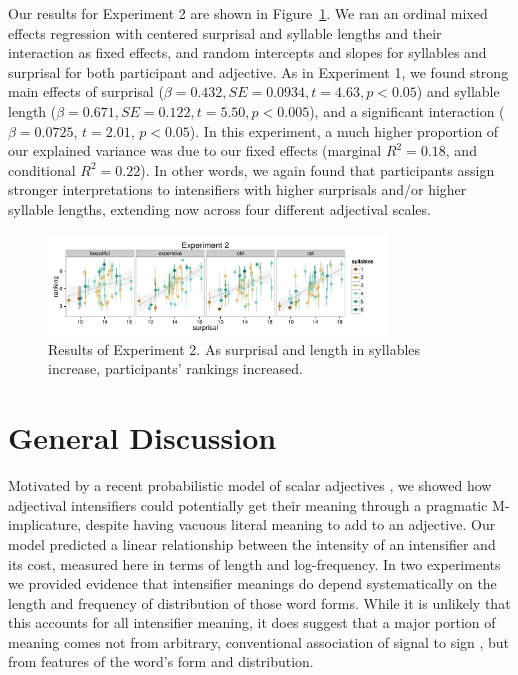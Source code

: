\documentclass[10pt,letterpaper]{article}
\begin{document}
Our results for Experiment 2 are shown in Figure~\ref{exp2-plot}. We ran an ordinal mixed effects
regression with centered surprisal and syllable lengths and their interaction as fixed effects, and random intercepts and slopes for syllables and surprisal for both participant and adjective.
As in Experiment 1, we found strong main effects of surprisal ($\beta=0.432, SE=0.0934, t=4.63, p<0.05$) and syllable length ($\beta=0.671, SE=0.122, t=5.50, p<0.005$), and a significant interaction ($\beta=0.0725$, $t=2.01$, $p<0.05$). In this experiment, a much higher proportion of our explained variance was due to our fixed effects
(marginal $R^2=0.18$, and conditional $R^2=0.22$).
In other words, we again found that participants assign stronger interpretations to intensifiers with higher surprisals and/or higher syllable lengths, extending now across four different adjectival scales.

\begin{figure}[ht]
\begin{center}
\includegraphics[width=0.8\textwidth]{analysis_files_for_writeup/images/exp2-plot.pdf}
\end{center}
\caption{Results of Experiment 2. As surprisal and length in syllables increase, participants' rankings increased.} 
\label{exp2-plot}
\end{figure}

\section{General Discussion}

Motivated by a recent probabilistic model of scalar adjectives \cite{lassiter}, we showed how adjectival intensifiers could potentially get their meaning through a pragmatic M-implicature, despite having vacuous literal meaning to add to an adjective. Our model predicted a linear relationship between the intensity of an intensifier and its cost, measured here in terms of length and log-frequency.
In two experiments we provided evidence that intensifier meanings do depend systematically on the length and frequency of distribution of those word forms.
While it is unlikely that this accounts for all intensifier meaning, it does suggest that a major portion of meaning comes not from arbitrary, conventional association of signal to sign \cite{saussure}, but from features of the word's form and distribution.
\end{document}
